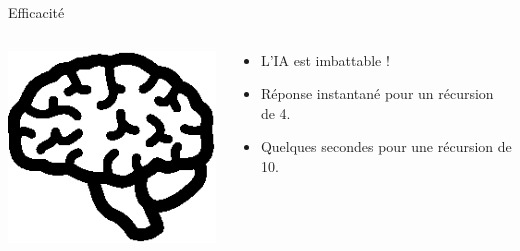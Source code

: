 \documentclass[compress, 12pt]{beamer}
\begin{document}
\begin{frame}{Efficacité}
    \begin{columns}
        \begin{column}{.2\textwidth}
            \includegraphics[width=1.3\textwidth]{./pix/sym_brain}
        \end{column}
        \begin{column}{.6\textwidth}
        \begin{itemize}
            \itemsep2em
	        \item L'IA est imbattable !
	        \item Réponse instantané pour un récursion de 4.
	        \item Quelques secondes pour une récursion de 10.
        \end{itemize}
        \end{column}
    \end{columns}
\end{frame}
\end{document}
